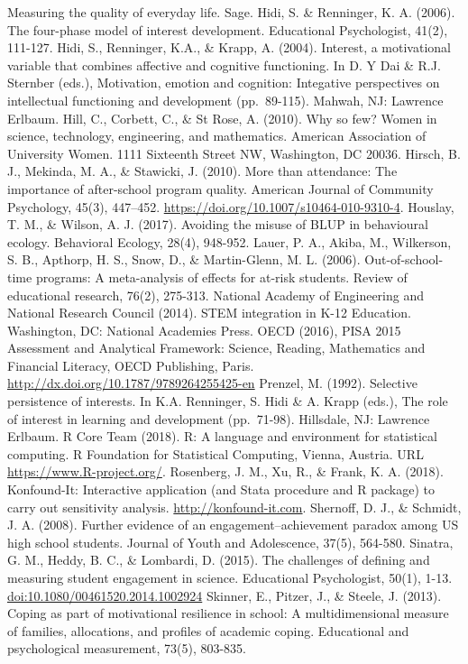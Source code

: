 \documentclass[man]{apa6}
\theoremstyle{definition}
\theoremstyle{definition}
\theoremstyle{definition}
\theoremstyle{remark}
\begin{document}
Measuring the quality of everyday life. Sage. Hidi, S. \& Renninger, K.
A. (2006). The four-phase model of interest development. Educational
Psychologist, 41(2), 111-127. Hidi, S., Renninger, K.A., \& Krapp, A.
(2004). Interest, a motivational variable that combines affective and
cognitive functioning. In D. Y Dai \& R.J. Sternber (eds.), Motivation,
emotion and cognition: Integative perspectives on intellectual
functioning and development (pp.~89-115). Mahwah, NJ: Lawrence Erlbaum.
Hill, C., Corbett, C., \& St Rose, A. (2010). Why so few? Women in
science, technology, engineering, and mathematics. American Association
of University Women. 1111 Sixteenth Street NW, Washington, DC 20036.
Hirsch, B. J., Mekinda, M. A., \& Stawicki, J. (2010). More than
attendance: The importance of after-school program quality. American
Journal of Community Psychology, 45(3), 447--452.
\url{https://doi.org/10.1007/s10464-010-9310-4}. Houslay, T. M., \&
Wilson, A. J. (2017). Avoiding the misuse of BLUP in behavioural
ecology. Behavioral Ecology, 28(4), 948-952. Lauer, P. A., Akiba, M.,
Wilkerson, S. B., Apthorp, H. S., Snow, D., \& Martin-Glenn, M. L.
(2006). Out-of-school-time programs: A meta-analysis of effects for
at-risk students. Review of educational research, 76(2), 275-313.
National Academy of Engineering and National Research Council (2014).
STEM integration in K-12 Education. Washington, DC: National Academies
Press. OECD (2016), PISA 2015 Assessment and Analytical Framework:
Science, Reading, Mathematics and Financial Literacy, OECD Publishing,
Paris. \url{http://dx.doi.org/10.1787/9789264255425-en} Prenzel, M.
(1992). Selective persistence of interests. In K.A. Renninger, S. Hidi
\& A. Krapp (eds.), The role of interest in learning and development
(pp.~71-98). Hillsdale, NJ: Lawrence Erlbaum. R Core Team (2018). R: A
language and environment for statistical computing. R Foundation for
Statistical Computing, Vienna, Austria. URL
\url{https://www.R-project.org/}. Rosenberg, J. M., Xu, R., \& Frank, K.
A. (2018). Konfound-It: Interactive application (and Stata procedure and
R package) to carry out sensitivity analysis.
\url{http://konfound-it.com}. Shernoff, D. J., \& Schmidt, J. A. (2008).
Further evidence of an engagement--achievement paradox among US high
school students. Journal of Youth and Adolescence, 37(5), 564-580.
Sinatra, G. M., Heddy, B. C., \& Lombardi, D. (2015). The challenges of
defining and measuring student engagement in science. Educational
Psychologist, 50(1), 1-13. \url{doi:10.1080/00461520.2014.1002924}
Skinner, E., Pitzer, J., \& Steele, J. (2013). Coping as part of
motivational resilience in school: A multidimensional measure of
families, allocations, and profiles of academic coping. Educational and
psychological measurement, 73(5), 803-835.
\end{document}
